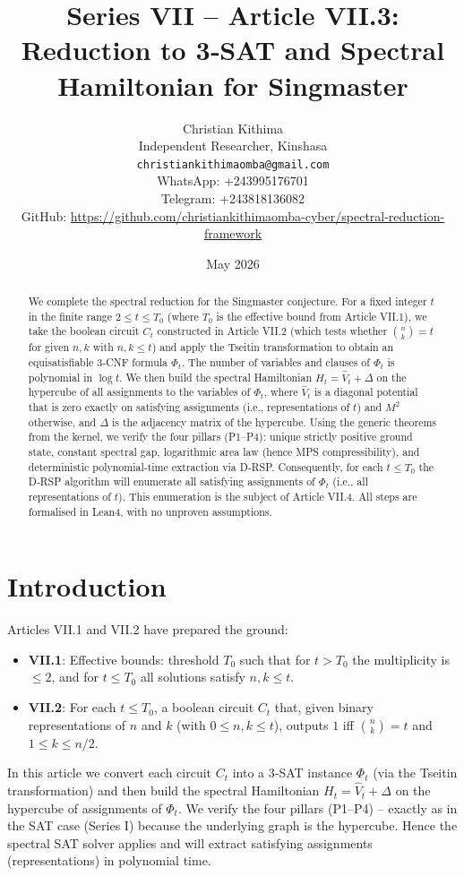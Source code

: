 \documentclass[11pt,a4paper]{article}
\title{Series VII – Article VII.3: Reduction to 3‑SAT and Spectral Hamiltonian for Singmaster}
\author{Christian Kithima \\
Independent Researcher, Kinshasa \\
\texttt{christiankithimaomba@gmail.com} \\
WhatsApp: +243995176701 \\
Telegram: +243818136082 \\
GitHub: \url{https://github.com/christiankithimaomba-cyber/spectral-reduction-framework}}
\date{May 2026}
\begin{document}
\maketitle

\begin{abstract}
We complete the spectral reduction for the Singmaster conjecture. For a fixed integer \(t\) in the finite range \(2 \le t \le T_0\) (where \(T_0\) is the effective bound from Article VII.1), we take the boolean circuit \(C_t\) constructed in Article VII.2 (which tests whether \(\binom{n}{k}=t\) for given \(n,k\) with \(n,k\le t\)) and apply the Tseitin transformation to obtain an equisatisfiable 3‑CNF formula \(\Phi_t\). The number of variables and clauses of \(\Phi_t\) is polynomial in \(\log t\). We then build the spectral Hamiltonian \(H_t = \hat{V}_t + \Delta\) on the hypercube of all assignments to the variables of \(\Phi_t\), where \(\hat{V}_t\) is a diagonal potential that is zero exactly on satisfying assignments (i.e., representations of \(t\)) and \(M^2\) otherwise, and \(\Delta\) is the adjacency matrix of the hypercube. Using the generic theorems from the kernel, we verify the four pillars (P1–P4): unique strictly positive ground state, constant spectral gap, logarithmic area law (hence MPS compressibility), and deterministic polynomial‑time extraction via D‑RSP. Consequently, for each \(t \le T_0\) the D‑RSP algorithm will enumerate all satisfying assignments of \(\Phi_t\) (i.e., all representations of \(t\)). This enumeration is the subject of Article VII.4. All steps are formalised in Lean4, with no unproven assumptions.
\end{abstract}

\tableofcontents

\section{Introduction}

Articles VII.1 and VII.2 have prepared the ground:
\begin{itemize}
\item \textbf{VII.1}: Effective bounds: threshold \(T_0\) such that for \(t > T_0\) the multiplicity is \(\le 2\), and for \(t \le T_0\) all solutions satisfy \(n,k \le t\).
\item \textbf{VII.2}: For each \(t \le T_0\), a boolean circuit \(C_t\) that, given binary representations of \(n\) and \(k\) (with \(0\le n,k\le t\)), outputs \(1\) iff \(\binom{n}{k}=t\) and \(1\le k\le n/2\).
\end{itemize}
In this article we convert each circuit \(C_t\) into a 3‑SAT instance \(\Phi_t\) (via the Tseitin transformation) and then build the spectral Hamiltonian \(H_t = \hat{V}_t + \Delta\) on the hypercube of assignments of \(\Phi_t\). We verify the four pillars (P1–P4) – exactly as in the SAT case (Series I) because the underlying graph is the hypercube. Hence the spectral SAT solver applies and will extract satisfying assignments (representations) in polynomial time.
\end{document}
